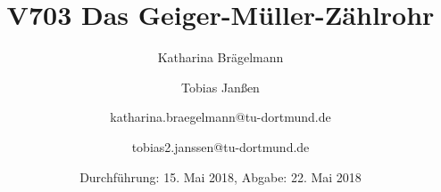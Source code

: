 
\title{V703 Das Geiger-Müller-Zählrohr}
\author{Katharina Brägelmann \and Tobias Janßen \and katharina.braegelmann@tu-dortmund.de \and tobias2.janssen@tu-dortmund.de}
\date{Durchführung: 15. Mai 2018, Abgabe: 22. Mai 2018}
\maketitle

\tableofcontents
